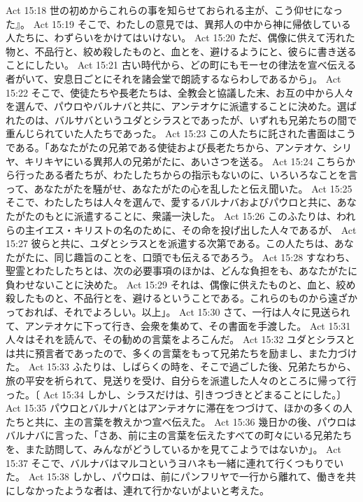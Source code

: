 Act 15:18  世の初めからこれらの事を知らせておられる主が、こう仰せになった』。
Act 15:19  そこで、わたしの意見では、異邦人の中から神に帰依している人たちに、わずらいをかけてはいけない。
Act 15:20  ただ、偶像に供えて汚れた物と、不品行と、絞め殺したものと、血とを、避けるようにと、彼らに書き送ることにしたい。
Act 15:21  古い時代から、どの町にもモーセの律法を宣べ伝える者がいて、安息日ごとにそれを諸会堂で朗読するならわしであるから」。
Act 15:22  そこで、使徒たちや長老たちは、全教会と協議した末、お互の中から人々を選んで、パウロやバルナバと共に、アンテオケに派遣することに決めた。選ばれたのは、バルサバというユダとシラスとであったが、いずれも兄弟たちの間で重んじられていた人たちであった。
Act 15:23  この人たちに託された書面はこうである。「あなたがたの兄弟である使徒および長老たちから、アンテオケ、シリヤ、キリキヤにいる異邦人の兄弟がたに、あいさつを送る。
Act 15:24  こちらから行ったある者たちが、わたしたちからの指示もないのに、いろいろなことを言って、あなたがたを騒がせ、あなたがたの心を乱したと伝え聞いた。
Act 15:25  そこで、わたしたちは人々を選んで、愛するバルナバおよびパウロと共に、あなたがたのもとに派遣することに、衆議一決した。
Act 15:26  このふたりは、われらの主イエス・キリストの名のために、その命を投げ出した人々であるが、
Act 15:27  彼らと共に、ユダとシラスとを派遣する次第である。この人たちは、あなたがたに、同じ趣旨のことを、口頭でも伝えるであろう。
Act 15:28  すなわち、聖霊とわたしたちとは、次の必要事項のほかは、どんな負担をも、あなたがたに負わせないことに決めた。
Act 15:29  それは、偶像に供えたものと、血と、絞め殺したものと、不品行とを、避けるということである。これらのものから遠ざかっておれば、それでよろしい。以上」。
Act 15:30  さて、一行は人々に見送られて、アンテオケに下って行き、会衆を集めて、その書面を手渡した。
Act 15:31  人々はそれを読んで、その勧めの言葉をよろこんだ。
Act 15:32  ユダとシラスとは共に預言者であったので、多くの言葉をもって兄弟たちを励まし、また力づけた。
Act 15:33  ふたりは、しばらくの時を、そこで過ごした後、兄弟たちから、旅の平安を祈られて、見送りを受け、自分らを派遣した人々のところに帰って行った。〔
Act 15:34  しかし、シラスだけは、引きつづきとどまることにした。〕
Act 15:35  パウロとバルナバとはアンテオケに滞在をつづけて、ほかの多くの人たちと共に、主の言葉を教えかつ宣べ伝えた。
Act 15:36  幾日かの後、パウロはバルナバに言った、「さあ、前に主の言葉を伝えたすべての町々にいる兄弟たちを、また訪問して、みんながどうしているかを見てこようではないか」。
Act 15:37  そこで、バルナバはマルコというヨハネも一緒に連れて行くつもりでいた。
Act 15:38  しかし、パウロは、前にパンフリヤで一行から離れて、働きを共にしなかったような者は、連れて行かないがよいと考えた。
